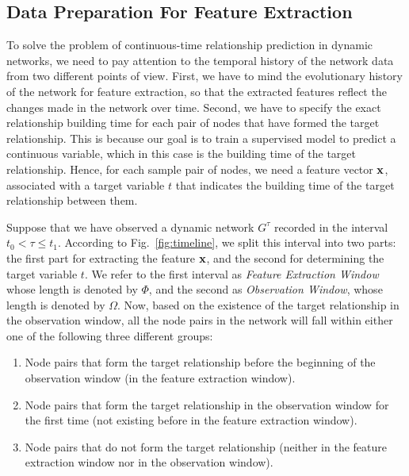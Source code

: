 \subsection{Data Preparation For Feature Extraction}
To solve the problem of continuous-time relationship prediction in dynamic networks, we need to pay attention to the temporal history of the network data from two different points of view. First, we have to mind the evolutionary history of the network for feature extraction, so that the extracted features reflect the changes made in the network over time. Second, we have to specify the exact relationship building time for each pair of nodes that have formed the target relationship. This is because our goal is to train a supervised model to predict a continuous variable, which in this case is the building time of the target relationship. Hence, for each sample pair of nodes, we need a feature vector $\mathbf{x}$, associated with a target variable $t$ that indicates the building time of the target relationship between them.

Suppose that we have observed a dynamic network $G^{\tau}$ recorded in the interval $t_0 <\tau\le t_1$. 
According to Fig.~\ref{fig:timeline}, we split this interval into two parts: the first part for extracting the feature $\mathbf{x}$, and the second for determining the target variable $t$. We refer to the first interval as \emph{Feature Extraction Window} whose length is denoted by $\Phi$, and the second as \emph{Observation Window}, whose length is denoted by $\Omega$. Now, based on the existence of the target relationship in the observation window, all the node pairs in the network will fall within either one of the following three different groups:

\begin{enumerate}
    \item Node pairs that form the target relationship before the beginning of the observation window (in the feature extraction window).
    \item Node pairs that form the target relationship in the observation window for the first time (not existing before in the feature extraction window).
    \item Node pairs that do not form the target relationship (neither in the feature extraction window nor in the observation window).
\end{enumerate}

